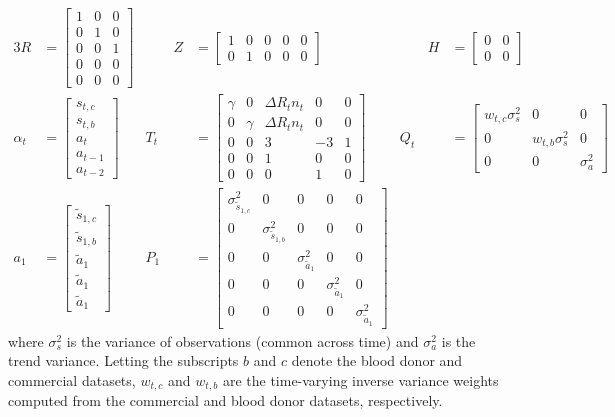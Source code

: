 \documentclass{article}
\begin{document}
\begin{alignat*}{3}
R &= \begin{bmatrix}
1 & 0 & 0 \\ 
0 & 1 & 0\\ 
0 & 0 & 1\\ 
0 & 0 & 0\\ 
0 & 0 & 0 
\end{bmatrix} &\qquad 
Z &= \begin{bmatrix}
1 & 0 & 0 & 0 & 0 \\ 
0 & 1 & 0 & 0 & 0
\end{bmatrix} &\qquad 
H &= \begin{bmatrix}
0 & 0 \\ 
0 & 0
\end{bmatrix} \\
\alpha_t &= \begin{bmatrix}
s_{t,c}\\
s_{t,b}\\ 
a_t\\ 
a_{t-1}\\ 
a_{t-2}
\end{bmatrix} & 
T_t &= \begin{bmatrix}
 \gamma & 0 & \Delta R_tn_t & 0 & 0\\ 
 0 & \gamma & \Delta R_tn_t & 0 & 0 \\ 
 0 & 0 & 3 & -3 & 1 \\ 
 0 & 0 & 1 & 0 & 0\\ 
 0 & 0 & 0 & 1 & 0
\end{bmatrix}  & 
Q_t &= \begin{bmatrix}
w_{t,c}\sigma^2_s & 0 & 0 \\ 
0 & w_{t,b}\sigma^2_s  & 0 \\ 
0 & 0 & \sigma^2_a
\end{bmatrix} \\
a_1 &= \begin{bmatrix}
\tilde{s}_{1,c}\\ 
\tilde{s}_{1,b}\\ 
\tilde{a}_1\\ 
\tilde{a}_1 \\
\tilde{a}_1
\end{bmatrix} & 
P_{1} &= \begin{bmatrix}
\sigma^2_{\tilde{s}_{1,c}} & 0 & 0 & 0 & 0\\ 
0 & \sigma^2_{\tilde{s}_{1,b}} & 0 & 0 & 0\\ 
0 & 0 & \sigma^2_{\tilde{a}_1} & 0 & 0\\ 
0 & 0 & 0 & \sigma^2_{\tilde{a}_1} & 0 \\ 
0 & 0 & 0 & 0 & \sigma^2_{\tilde{a}_1}
\end{bmatrix} 
\end{alignat*}
where $\sigma^2_s$ is the variance of observations (common across time) and
$\sigma^2_a$ is the trend variance. Letting the subscripts $b$ and $c$ denote
the blood donor and commercial datasets, $w_{t,c}$ and $w_{t,b}$ are the
time-varying inverse variance weights computed from the commercial and blood
donor datasets, respectively. 
\end{document}
